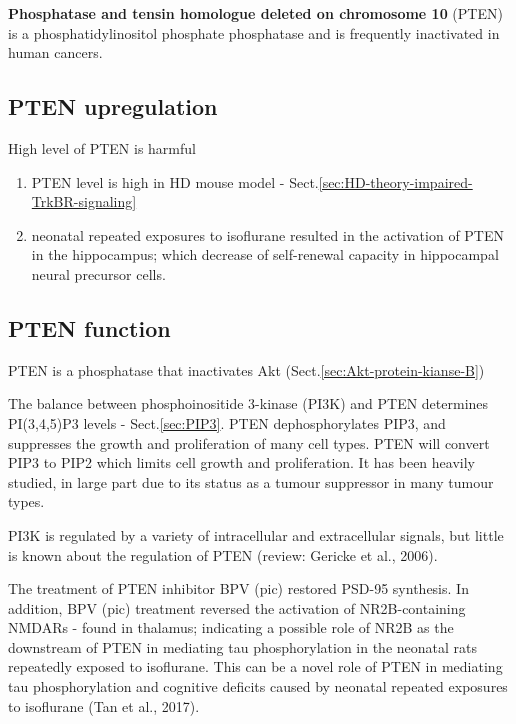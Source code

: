 {\bf Phosphatase and tensin homologue deleted on chromosome 10} (PTEN) is a
phosphatidylinositol phosphate phosphatase and is frequently inactivated in
human cancers. 

\subsection{PTEN upregulation}
\label{sec:PTEN-high-level}

High level of PTEN is harmful
\begin{enumerate}
  \item PTEN level is high in HD mouse model - Sect.\ref{sec:HD-theory-impaired-TrkBR-signaling}
  
  \item neonatal repeated exposures to isoflurane resulted in the activation of
  PTEN in the hippocampus; which decrease of self-renewal capacity in
  hippocampal neural precursor cells.
  
\end{enumerate}

\subsection{PTEN function}
\label{sec:PTEN-function}

PTEN is a phosphatase that inactivates Akt (Sect.\ref{sec:Akt-protein-kianse-B})

The balance between phosphoinositide 3-kinase (PI3K) and PTEN determines
PI(3,4,5)P3 levels - Sect.\ref{sec:PIP3}. 
PTEN dephosphorylates PIP3, and suppresses the growth and proliferation of many
cell types.  PTEN will convert PIP3 to PIP2 which limits cell
growth and proliferation. It has been heavily studied, in large part due to its
status as a tumour suppressor in many tumour types.

PI3K is regulated by a variety of intracellular and extracellular signals, but
little is known about the regulation of PTEN (review: Gericke et al., 2006).


The treatment of PTEN inhibitor BPV (pic) restored PSD-95 synthesis.
In addition, BPV (pic) treatment reversed the activation of NR2B-containing
NMDARs - found in thalamus; indicating a possible role of NR2B as the downstream
of PTEN in mediating tau phosphorylation in the neonatal rats repeatedly exposed
to isoflurane.  This can be a  novel role of PTEN in mediating tau
phosphorylation and cognitive deficits caused by neonatal repeated exposures to
isoflurane (Tan et al., 2017).



